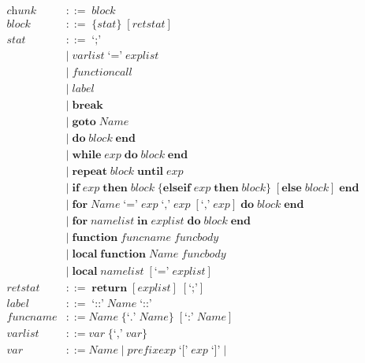 \begin{align*}
\textit{chunk} & ::= \; \textit{block}\\
\textit{block} & ::= \; \{\textit{stat}\} \; [\textit{retstat}]\\
\textit{stat} & ::= \; \texttt{`;'}\\
& | \; \textit{varlist} \; \texttt{`='} \; \textit{explist}\\
& | \; \textit{functioncall}\\
& | \; \textit{label}\\
& | \; \textbf{break}\\ 
& | \; \textbf{goto} \; \textit{Name}\\
& | \; \textbf{do} \; \textit{block} \; \textbf{end}\\
& | \; \textbf{while} \; \textit{exp} \; \textbf{do} \; \textit{block} \; \textbf{end}\\
& | \; \textbf{repeat} \; \textit{block} \; \textbf{until} \; \textit{exp}\\
& | \; \textbf{if} \; \textit{exp} \; \textbf{then} \; \textit{block} \;
  \{\textbf{elseif} \; \textit{exp} \; \textbf{then} \; \textit{block}\} \;
  [\textbf{else} \; \textit{block}] \; \textbf{end}\\ 
& | \; \textbf{for} \; \textit{Name} \; \texttt{`='} \; \textit{exp} \;
  \texttt{`,'} \; \textit{exp} \; [\texttt{`,'} \; \textit{exp}] \;
  \textbf{do} \; \textit{block} \; \textbf{end}\\
& | \; \textbf{for} \; \textit{namelist} \; \textbf{in} \; \textit{explist} \;
  \textbf{do} \; \textit{block} \; \textbf{end}\\
& | \; \textbf{function} \; \textit{funcname} \; \textit{funcbody}\\
& | \; \textbf{local} \; \textbf{function} \; \textit{Name} \; \textit{funcbody}\\
& | \; \textbf{local} \; \textit{namelist} \; [\texttt{`='} \; \textit{explist}]\\
\textit{retstat} & ::= \; \textbf{return} \; [\textit{explist}] \; [\texttt{`;'}]\\
\textit{label} & ::= \; \texttt{`::'} \; \textit{Name} \; \texttt{`::'}\\
\textit{funcname} & ::= \textit{Name} \; \{\texttt{`.'} \; \textit{Name}\} \; [\texttt{`:'} \; \textit{Name}]\\
\textit{varlist} & ::= \textit{var} \; \{\texttt{`,'} \; \textit{var}\}\\
\textit{var} & ::= \textit{Name} \; | \;
  \textit{prefixexp} \; \texttt{`['} \; \textit{exp} \; \texttt{`]'} \; | \;

\end{align*}
